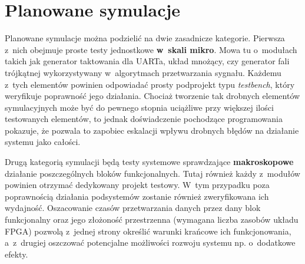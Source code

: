 
\section{Planowane symulacje}

Planowane symulacje można podzielić na dwie zasadnicze kategorie. Pierwsza z~nich obejmuje proste testy jednostkowe \textbf{w~skali mikro}. Mowa tu o~modułach takich jak generator taktowania dla UARTa, układ mnożący, czy generator fali trójkątnej wykorzystywany w~algorytmach przetwarzania sygnału. Każdemu z~tych elementów powinien odpowiadać prosty podprojekt typu \textit{testbench}, który weryfikuje poprawność jego działania. Chociaż tworzenie tak drobnych elementów symulacyjnych może być do pewnego stopnia uciążliwe przy większej ilości testowanych elementów, to jednak doświadczenie pochodzące programowania pokazuje, że pozwala to zapobiec eskalacji wpływu drobnych błędów na działanie systemu jako całości.

Drugą kategorią symulacji będą testy systemowe sprawdzające \textbf{makroskopowe} działanie poszczególnych bloków funkcjonalnych. Tutaj również każdy z~modułów powinien otrzymać dedykowany projekt testowy. W~tym przypadku poza poprawnością działania podsystemów zostanie również zweryfikowana ich wydajność. Oszacowanie czasów przetwarzania danych przez dany blok funkcjonalny oraz jego złożoność przestrzenna (wymagana liczba zasobów układu FPGA) pozwolą z~jednej strony określić warunki krańcowe ich funkcjonowania, a~z~drugiej oszczować potencjalne możliwości rozwoju systemu np. o~dodatkowe efekty.
